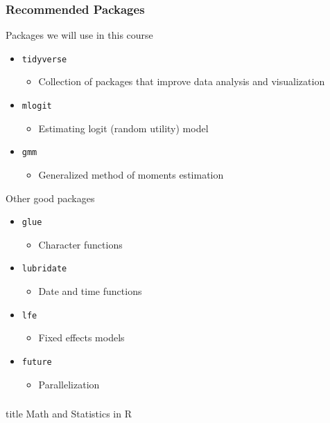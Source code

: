 \documentclass{beamer}
\begin{document}
\begin{frame}\frametitle{Recommended Packages}
    Packages we will use in this course
    \begin{itemize}
        \item \texttt{tidyverse}
        \begin{itemize}
            \item Collection of packages that improve data analysis and visualization
        \end{itemize}
        \item \texttt{mlogit}
        \begin{itemize}
            \item Estimating logit (random utility) model
        \end{itemize}
        \item \texttt{gmm}
        \begin{itemize}
            \item Generalized method of moments estimation
        \end{itemize}
    \end{itemize}
    \vspace{0.5ex}
    Other good packages
    \begin{itemize}
        \item \texttt{glue}
        \begin{itemize}
            \item Character functions
        \end{itemize}
        \item \texttt{lubridate}
        \begin{itemize}
            \item Date and time functions
        \end{itemize}
        \item \texttt{lfe}
        \begin{itemize}
            \item Fixed effects models
        \end{itemize}
        \item \texttt{future}
        \begin{itemize}
            \item Parallelization
        \end{itemize}
    \end{itemize}
\end{frame}

\begin{frame}\frametitle{}
    \vfill
    \centering
    \begin{beamercolorbox}[center]{title}
        \Large Math and Statistics in R
    \end{beamercolorbox}
    \vfill
\end{frame}
\end{document}
